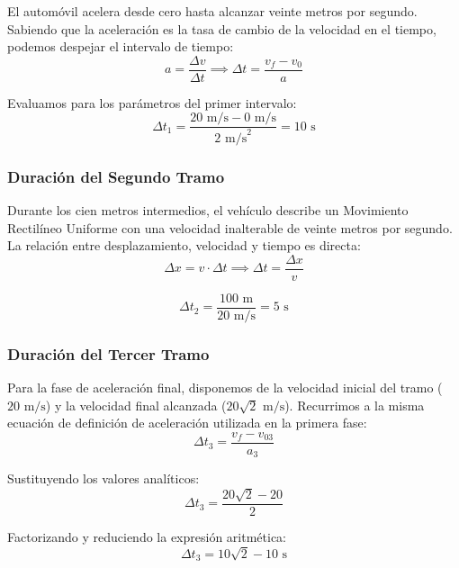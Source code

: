 \documentclass[12pt, a4paper]{article}
\begin{document}
El automóvil acelera desde cero hasta alcanzar veinte metros por segundo. Sabiendo que la aceleración es la tasa de cambio de la velocidad en el tiempo, podemos despejar el intervalo de tiempo:
\begin{equation}
a = \frac{\Delta v}{\Delta t} \implies \Delta t = \frac{v_f - v_0}{a}
\end{equation}

Evaluamos para los parámetros del primer intervalo:
\begin{equation}
\Delta t_1 = \frac{20 \text{ m/s} - 0 \text{ m/s}}{2 \text{ m/s}^2} = 10 \text{ s}
\end{equation}

\subsubsection*{Duración del Segundo Tramo}

Durante los cien metros intermedios, el vehículo describe un Movimiento Rectilíneo Uniforme con una velocidad inalterable de veinte metros por segundo. La relación entre desplazamiento, velocidad y tiempo es directa:
\begin{equation}
\Delta x = v \cdot \Delta t \implies \Delta t = \frac{\Delta x}{v}
\end{equation}

\begin{equation}
\Delta t_2 = \frac{100 \text{ m}}{20 \text{ m/s}} = 5 \text{ s}
\end{equation}

\subsubsection*{Duración del Tercer Tramo}

Para la fase de aceleración final, disponemos de la velocidad inicial del tramo ($20 \text{ m/s}$) y la velocidad final alcanzada ($20\sqrt{2} \text{ m/s}$). Recurrimos a la misma ecuación de definición de aceleración utilizada en la primera fase:
\begin{equation}
\Delta t_3 = \frac{v_f - v_{03}}{a_3}
\end{equation}

Sustituyendo los valores analíticos:
\begin{equation}
\Delta t_3 = \frac{20\sqrt{2} - 20}{2}
\end{equation}

Factorizando y reduciendo la expresión aritmética:
\begin{equation}
\Delta t_3 = 10\sqrt{2} - 10 \text{ s}
\end{equation}
\end{document}
